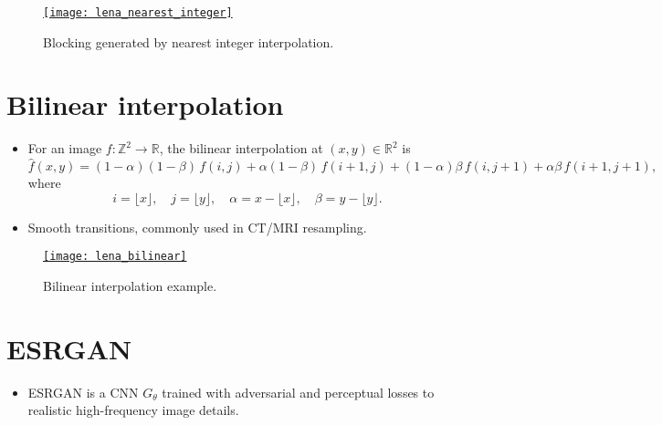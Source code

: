 \begin{figure}[H]
  \vspace{0ex}
  \centering
  \href{https://github.com/vicente-gonzalez-ruiz/medical_imaging/blob/main/notebooks/nearest_integer_interpolation.ipynb}{\texttt{[image: lena\_nearest\_integer]}}
  \caption{Blocking generated by nearest integer interpolation.}
  \label{fig:pixel_blocking}
\end{figure}

\section{Bilinear interpolation \cite{gonzalez2009digital}}

\begin{itemize}
\item For an image $f: \mathbb{Z}^2 \to \mathbb{R}$, the bilinear interpolation at 
$(x,y) \in \mathbb{R}^2$ is
\begin{equation}
\hat{f}(x,y) = (1-\alpha)(1-\beta)\, f(i,j) 
+ \alpha(1-\beta)\, f(i+1,j) 
+ (1-\alpha)\beta\, f(i,j+1) 
+ \alpha\beta\, f(i+1,j+1),
\end{equation}
where
\[
i = \lfloor x \rfloor, \quad j = \lfloor y \rfloor, \quad
\alpha = x - \lfloor x \rfloor, \quad \beta = y - \lfloor y \rfloor.
\]

\newpage
\item Smooth transitions, commonly used in \gls{CT}/\gls{MRI} resampling.
\end{itemize}

\begin{figure}[H]
  \vspace{-1ex}
  \centering
  \href{https://github.com/vicente-gonzalez-ruiz/medical_imaging/blob/main/notebooks/bilinear_interpolation.ipynb}{\texttt{[image: lena\_bilinear]}}
  \caption{Bilinear interpolation example.}
  \label{fig:bilinear_interpolation}
\end{figure}

\section{\gls{ESRGAN} \cite{wang2018esrga}}
\begin{itemize}
\item ESRGAN is a  \gls{CNN}
  $G_\theta$ trained with adversarial and perceptual losses to
   realistic high-frequency image
  details.
\end{itemize}

